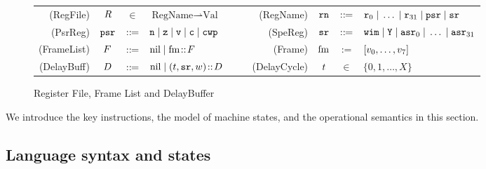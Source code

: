 \begin{figure}[!t]
	\begin{tabular}{rcclcrccl}
		(RegFile) & $R$ & $\in$ & $\text{RegName} \rightharpoonup 
			\text{Val}$

         & $\quad$ &
        (RegName) & $\texttt{rn}$ & $::\!\!{=}$ &
         $\texttt{r}_{0} \; | \; \dots \; | \; \texttt{r}_{31} \; | \; \texttt{psr} \; | \; \texttt{sr}$ \\
		
		(PsrReg) & $\texttt{psr}$ & $::\!\!{=}$ &
		$\texttt{n} \; | \;
			\texttt{z} \; | \;
			\texttt{v} \; | \;
			\texttt{c} \; | \; \texttt{cwp}$ & $\quad$ &
		(SpeReg) & $\texttt{sr}$ & $::\!\!{=}$ &
		$\texttt{wim} \; | \;
			\texttt{Y} \; | \;
\texttt{asr}_0 \; | \; \dots \; | \; \texttt{asr}_{31}$ \\
		
		(FrameList) & $F$ & $::\!\!{=}$ &
                            $\text{nil} \; | \; \text{fm} \!::\! F$ & $\quad$ &
		(Frame) & $\text{fm}$ & := & $[v_0, \dots, v_7]$ \\
		
		(DelayBuff) & $D$ & $::\!\!{=}$ & $\text{nil} \; | \;
                                  (t, \texttt{sr}, w) \!::\! D$
                                  & $\quad$
		& (DelayCycle) & $t$ & $\in$ & $\{ 0, 1, \dots, X \}$
	\end{tabular}
	\caption{Register File, Frame List and DelayBuffer}
	\label{fig:Register File and Frame List}
\end{figure}

We introduce the key \sparc{} instructions, the model of machine
states, and the operational semantics in this section.

\subsection{Language syntax and states}
\label{subsec:syntax}
		
